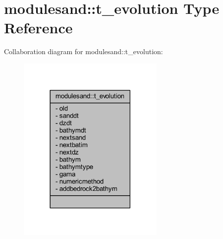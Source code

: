 \hypertarget{structmodulesand_1_1t__evolution}{}\section{modulesand\+:\+:t\+\_\+evolution Type Reference}
\label{structmodulesand_1_1t__evolution}


Collaboration diagram for modulesand\+:\+:t\+\_\+evolution\+:\nopagebreak
\begin{figure}[H]
\begin{center}
\leavevmode
\includegraphics[width=201pt]{structmodulesand_1_1t__evolution__coll__graph}
\end{center}
\end{figure}
